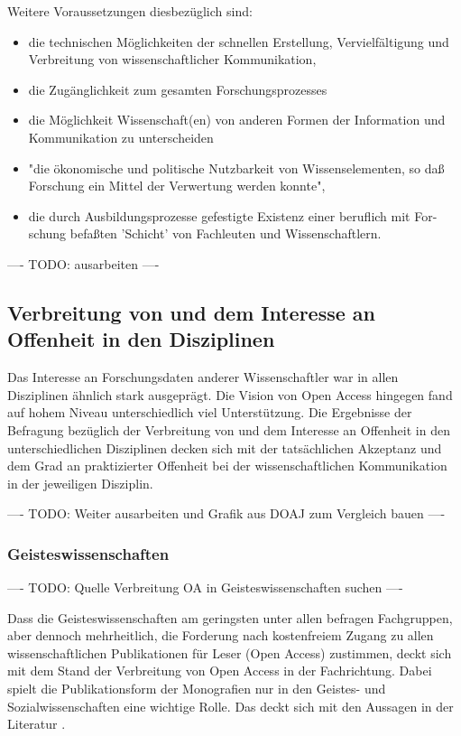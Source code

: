 Weitere Voraussetzungen diesbezüglich sind:
\begin{itemize}
\item die technischen Möglichkeiten der schnellen Erstellung, Vervielfältigung und Verbreitung von wissenschaftlicher Kommunikation,
\item die Zugänglichkeit zum gesamten Forschungsprozesses
\item die Möglichkeit Wissenschaft(en) von anderen Formen der Information und Kommunikation zu unterscheiden
\item "die ökonomische und politische Nutzbarkeit von Wissenselementen, so daß
Forschung ein Mittel der Verwertung werden konnte",
\item die durch Ausbildungsprozesse gefestigte Existenz einer beruflich mit For-
schung befaßten 'Schicht' von Fachleuten und Wissenschaftlern.
\end{itemize}

---- TODO: ausarbeiten ----

\subsection{Verbreitung von und dem Interesse an Offenheit in den Disziplinen}

Das Interesse an Forschungsdaten anderer Wissenschaftler war in allen Disziplinen ähnlich stark ausgeprägt. Die Vision von Open Access hingegen fand auf hohem Niveau unterschiedlich viel Unterstützung. Die Ergebnisse der Befragung bezüglich der Verbreitung von und dem Interesse an Offenheit in den unterschiedlichen Disziplinen decken sich mit der tatsächlichen Akzeptanz und dem Grad an praktizierter Offenheit bei der wissenschaftlichen Kommunikation in der jeweiligen Disziplin.

---- TODO: Weiter ausarbeiten und Grafik aus DOAJ zum Vergleich bauen  ----

\subsubsection{Geisteswissenschaften}

---- TODO: Quelle Verbreitung OA in Geisteswissenschaften suchen  ----

Dass die Geisteswissenschaften am geringsten unter allen befragen Fachgruppen, aber dennoch mehrheitlich, die Forderung nach kostenfreiem Zugang zu allen wissenschaftlichen Publikationen für Leser (Open Access) zustimmen, deckt sich mit dem Stand der Verbreitung von Open Access in der Fachrichtung. Dabei spielt die Publikationsform der Monografien nur in den Geistes- und Sozialwissenschaften eine wichtige Rolle. Das deckt sich mit den Aussagen in der Literatur \cite{naeder_2010_open} \cite{Lossau_oa_2007}.


